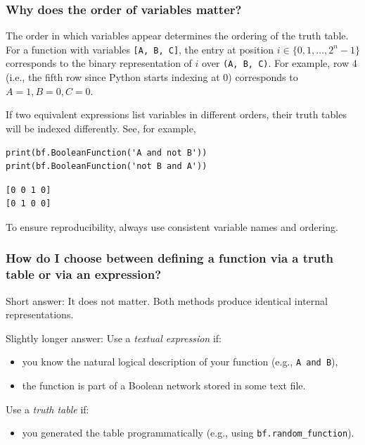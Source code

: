 \documentclass[
]{article}
\providecommand{\tightlist}{%
  \setlength{\itemsep}{0pt}\setlength{\parskip}{0pt}}
\begin{document}
\subsubsection{Why does the order of variables
matter?}\label{why-does-the-order-of-variables-matter}

The order in which variables appear determines the ordering of the truth
table. For a function with variables \texttt{{[}A,\ B,\ C{]}}, the entry
at position \(i\in\{0,1,\ldots,2^n-1\}\) corresponds to the binary
representation of \(i\) over \texttt{(A,\ B,\ C)}. For example, row 4
(i.e., the fifth row since Python starts indexing at 0) corresponds to
\(A = 1, B = 0, C = 0\).

If two equivalent expressions list variables in different orders, their
truth tables will be indexed differently. See, for example,

\begin{lstlisting}
print(bf.BooleanFunction('A and not B'))
print(bf.BooleanFunction('not B and A'))
\end{lstlisting}

\begin{lstlisting}
[0 0 1 0]
[0 1 0 0]
\end{lstlisting}

To ensure reproducibility, always use consistent variable names and
ordering.

\subsubsection{How do I choose between defining a function via a truth
table or via an
expression?}\label{how-do-i-choose-between-defining-a-function-via-a-truth-table-or-via-an-expression}

Short answer: It does not matter. Both methods produce identical
internal representations.

Slightly longer answer: Use a \emph{textual expression} if:

\begin{itemize}
\tightlist
\item
  you know the natural logical description of your function (e.g.,
  \texttt{A\ and\ B}),
\item
  the function is part of a Boolean network stored in some text file.
\end{itemize}

Use a \emph{truth table} if:

\begin{itemize}
\tightlist
\item
  you generated the table programmatically (e.g., using
  \texttt{bf.random\_function}).
\end{itemize}
\end{document}
